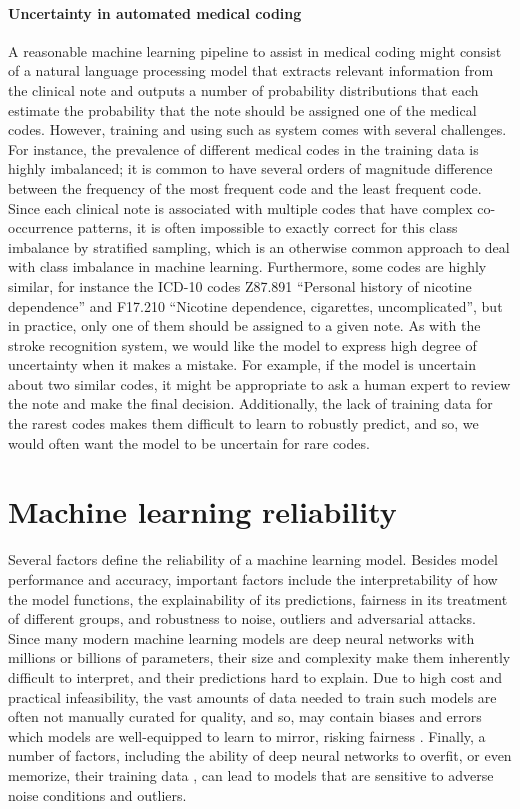 \paragraph{Uncertainty in automated medical coding} A reasonable machine learning pipeline to assist in medical coding might consist of a natural language processing model that extracts relevant information from the clinical note and outputs a number of probability distributions that each estimate the probability that the note should be assigned one of the medical codes. 
However, training and using such as system comes with several challenges. 
For instance, the prevalence of different medical codes in the training data is highly imbalanced; it is common to have several orders of magnitude difference between the frequency of the most frequent code and the least frequent code. Since each clinical note is associated with multiple codes that have complex co-occurrence patterns, it is often impossible to exactly correct for this class imbalance by stratified sampling, which is an otherwise common approach to deal with class imbalance in machine learning. 
Furthermore, some codes are highly similar, for instance the ICD-10 codes Z87.891 ``Personal history of nicotine dependence'' and F17.210 ``Nicotine dependence, cigarettes, uncomplicated'', but in practice, only one of them should be assigned to a given note. 
As with the stroke recognition system, we would like the model to express high degree of uncertainty when it makes a mistake. For example, if the model is uncertain about two similar codes, it might be appropriate to ask a human expert to review the note and make the final decision. Additionally, the lack of training data for the rarest codes makes them difficult to learn to robustly predict, and so, we would often want the model to be uncertain for rare codes. 


\section{Machine learning reliability} \label{sec:machine-learning-reliability}
%
Several factors define the reliability of a machine learning model. 
Besides model performance and accuracy, important factors include the interpretability of how the model functions, the explainability of its predictions, fairness in its treatment of different groups, and robustness to noise, outliers and adversarial attacks. 
Since many modern machine learning models are deep neural networks with millions or billions of parameters, their size and complexity make them inherently difficult to interpret, and their predictions hard to explain. 
Due to high cost and practical infeasibility, the vast amounts of data needed to train such models are often not manually curated for quality, and so, may contain biases and errors which models are well-equipped to learn to mirror, risking fairness \parencite{burkart_survey_2021}. 
Finally, a number of factors, including the ability of deep neural networks to overfit, or even memorize, their training data \parencite{arpit_closer_2017, burg_memorization_2021}, can lead to models that are sensitive to adverse noise conditions and outliers. 

